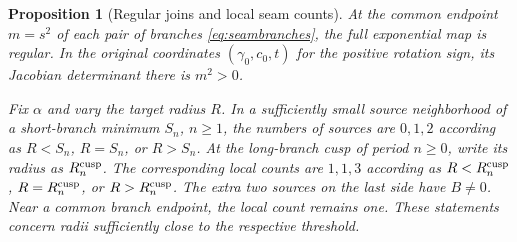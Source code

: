 \documentclass[11pt,a4paper]{article}
\newtheorem{proposition}[theorem]{Proposition}
\theoremstyle{remark}\newtheorem{remark}[theorem]{Remark}
\begin{document}
\begin{proposition}[Regular joins and local seam counts]
\label{prop:seam-local-counts}
At the common endpoint $m=s^2$ of each pair of branches
\eqref{eq:seambranches}, the full exponential map is regular.
In the original coordinates $(\gamma_0,c_0,t)$ for the positive
rotation sign, its Jacobian determinant there is $m^2>0$.

Fix $\alpha$ and vary the target radius $R$. In a sufficiently small
source neighborhood of a short-branch minimum $S_n$, $n\ge1$,
the numbers of sources are $0,1,2$ according as $R<S_n$, $R=S_n$,
or $R>S_n$. At the long-branch cusp of period $n\ge0$, write its
radius as $R_n^{\rm cusp}$. The corresponding local counts are $1,1,3$
according as $R<R_n^{\rm cusp}$, $R=R_n^{\rm cusp}$, or $R>R_n^{\rm cusp}$. The extra two sources
on the last side have $B\ne0$. Near a common branch endpoint,
the local count remains one. These statements concern radii
sufficiently close to the respective threshold.
\end{proposition}
\end{document}
